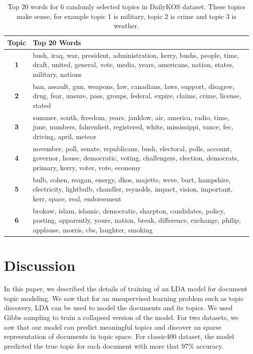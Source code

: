 \documentclass[twoside,12pt]{article}
\begin{document}
\begin{table}[h!]
\begin{center}
\begin{tabular}{| c | p{12cm} |}
\hline
\textbf{Topic}& \textbf{Top 20 Words}  \\ \hline
\textbf{1}&bush, iraq, war, president, administration, kerry, bushs, people, time, draft, united, general, vote, media, years, americans, nation, states, military, nations\\ \hline
\textbf{2}& ban, assault, gun, weapons, law, canadians, laws, support, disagree, drug, fear, unsure, pass, groups, federal, expire, claims, crime, license, stated
\\
 \hline
\textbf{3}&summer, south, freedom, years, janklow, air, america, radio, time, june, numbers, fahrenheit, registered, white, mississippi, vance, fec, driving, april, meteor\\
 \hline

\textbf{4}&november, poll, senate, republicans, bush, electoral, polls, account, governor, house, democratic, voting, challengers, election, democrats, primary, kerry, voter, vote, economy
\\
 \hline

\textbf{5} &  bulb, cohen, reagan, energy, dkos, majette, weve,
 burt, hampshire, electricity, lightbulb, chandler,
 reynolds, impact, vision, important, kerr, space,
 real, endorsement
\\
 \hline

\textbf{6} &  brokaw, islam, islamic, democratic, sharpton,
 candidates, policy, posting, apparently, youre, nation,
 break, difference, exchange, philip, applause, morris,
 cbs, laughter, smoking
\\
 \hline
 
 
 
\end{tabular}
\caption{Top 20 words for 6 randomly selected topics in DailyKOS dataset. These topics make sense, for example topic 1 is military, topic 2 is crime and topic 3 is weather.}
\label{tableDKTopWords}
\end{center}
\end{table}


\section{Discussion}
In this paper, we described the details of training of an LDA model for document topic modeling. We saw that for an unsupervised learning problem such as topic discovery, LDA can be used to model the documents and its topics. We used Gibbs sampling to train a collapsed version of the model. For two datasets, we saw that our model can predict meaningful topics and discover an sparse representation of documents in topic space. For classic400 dataset, the model predicted the true topic for each document with more that 97\% accuracy.
\end{document}
